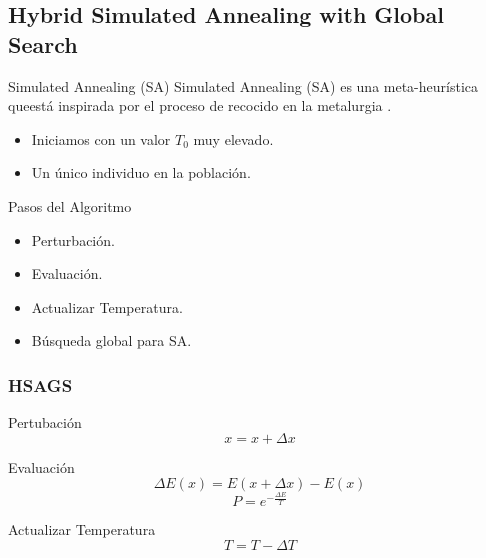 \subsection{Hybrid Simulated Annealing with Global Search}

\begin{frame}{}
\begin{block}{Simulated Annealing (SA)}
Simulated Annealing (SA) \cite{SA1, SA2, SA3} es una meta-heurística queestá inspirada por el proceso de recocido en la metalurgia \cite{metabook}.
\begin{itemize}
  \item Iniciamos con un valor $T_{0}$ muy elevado.
  \item Un único individuo en la población.
\end{itemize}
\end{block}
\begin{block}{Pasos del Algoritmo}
\begin{itemize}
  \item Perturbación.
  \item Evaluación.
  \item Actualizar Temperatura.
  \item Búsqueda global para SA.
\end{itemize}
\end{block}
\end{frame}
\begin{frame}
\frametitle{HSAGS}
\begin{block}{Pertubación}
\begin{equation}\label{eq:perturbation}
    x = x + \Delta x
\end{equation}
\end{block}
\begin{block}{Evaluación}
\begin{equation}\label{eq:evaluate}
    \Delta E(x) = E(x + \Delta x) - E(x)
\end{equation}
\begin{equation}\label{eq:other}
    P = e^{- \frac{\Delta E}{T}}
\end{equation}
\end{block}
\begin{block}{Actualizar Temperatura}
\begin{equation} \label{eq:decreaseT}
    T = T - \Delta T
\end{equation}
\end{block}
\end{frame}

